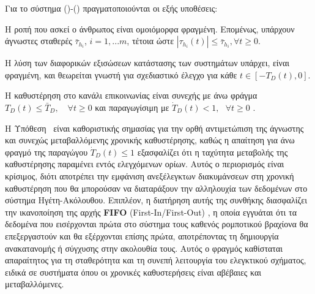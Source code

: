 Για το σύστημα ()-() πραγματοποιούνται οι εξής υποθέσεις:\\

\begin{hypothesis}\label{hyp:1}
Η ροπή που ασκεί ο άνθρωπος είναι ομοιόμορφα φραγμένη. Επομένως, υπάρχουν άγνωστες σταθερές $\bar{\tau}_{h_{i}}$, $i=1,...m$, τέτοια ώστε $\left|\tau_{h_{i}}(t)\right| \leq \bar{\tau}_{h_{i}}, \forall t \geq 0$.\\
\end{hypothesis}

\begin{hypothesis}\label{hyp:2}
Η λύση των διαφορικών εξισώσεων κατάστασης των συστημάτων υπάρχει, είναι φραγμένη, και θεωρείται γνωστή για σχεδιαστικό έλεγχο για κάθε $t\in[-T_{D}(t), 0]$.\\
\end{hypothesis}

\begin{hypothesis}\label{hyp:3}
Η καθυστέρηση στο κανάλι επικοινωνίας είναι συνεχής με άνω φράγμα $T_{D}(t) \leq \bar{T}_{D},\text{ }$ $\forall t\geq 0$ και παραγωγίσιμη με $\dot{T}_{D}(t) < 1,\text{ } \forall t \geq 0$ .\\
\end{hypothesis}

\begin{observation}\label{obs:1}
Η Υπόθεση~ είναι καθοριστικής σημασίας για την ορθή αντιμετώπιση της άγνωστης και συνεχώς μεταβαλλόμενης χρονικής καθυστέρησης, καθώς η απαίτηση για άνω φραγμό της παραγώγου $\dot{T}_{D}(t) \leq 1$ εξασφαλίζει ότι η ταχύτητα μεταβολής της καθυστέρησης παραμένει εντός ελεγχόμενων ορίων. Αυτός ο περιορισμός είναι κρίσιμος, διότι αποτρέπει την εμφάνιση ανεξέλεγκτων διακυμάνσεων στη χρονική καθυστέρηση που θα μπορούσαν να διαταράξουν την αλληλουχία των δεδομένων στο σύστημα Ηγέτη-Ακόλουθου. Επιπλέον, η διατήρηση αυτής της συνθήκης διασφαλίζει την ικανοποίηση της αρχής \textbf{FIFO} (First-In/First-Out) \cite{bresch2018robust}, η οποία εγγυάται ότι τα δεδομένα που εισέρχονται πρώτα στο σύστημα τους καθενός ρομποτικού βραχίονα θα επεξεργαστούν και θα εξέρχονται επίσης πρώτα, αποτρέποντας τη δημιουργία ανακατανομής ή σύγχυσης στην ακολουθία τους. Αυτός ο φραγμός καθίσταται απαραίτητος για τη σταθερότητα και τη συνεπή λειτουργία του ελεγκτικού σχήματος, ειδικά σε συστήματα όπου οι χρονικές καθυστερήσεις είναι αβέβαιες και μεταβαλλόμενες.
\end{observation}

